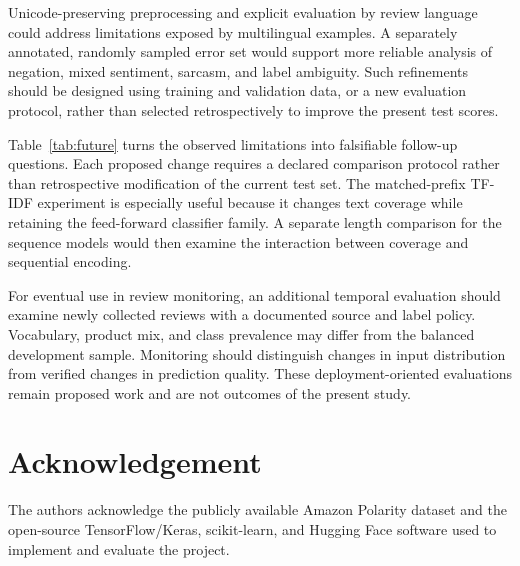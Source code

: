 Unicode-preserving preprocessing and explicit evaluation by review language could address limitations exposed by multilingual examples. A separately annotated, randomly sampled error set would support more reliable analysis of negation, mixed sentiment, sarcasm, and label ambiguity. Such refinements should be designed using training and validation data, or a new evaluation protocol, rather than selected retrospectively to improve the present test scores.




Table~\ref{tab:future} turns the observed limitations into falsifiable follow-up questions. Each proposed change requires a declared comparison protocol rather than retrospective modification of the current test set. The matched-prefix TF-IDF experiment is especially useful because it changes text coverage while retaining the feed-forward classifier family. A separate length comparison for the sequence models would then examine the interaction between coverage and sequential encoding.

For eventual use in review monitoring, an additional temporal evaluation should examine newly collected reviews with a documented source and label policy. Vocabulary, product mix, and class prevalence may differ from the balanced development sample. Monitoring should distinguish changes in input distribution from verified changes in prediction quality. These deployment-oriented evaluations remain proposed work and are not outcomes of the present study.


\section*{Acknowledgement}
{}
The authors acknowledge the publicly available Amazon Polarity dataset and the open-source TensorFlow/Keras, scikit-learn, and Hugging Face software used to implement and evaluate the project.
